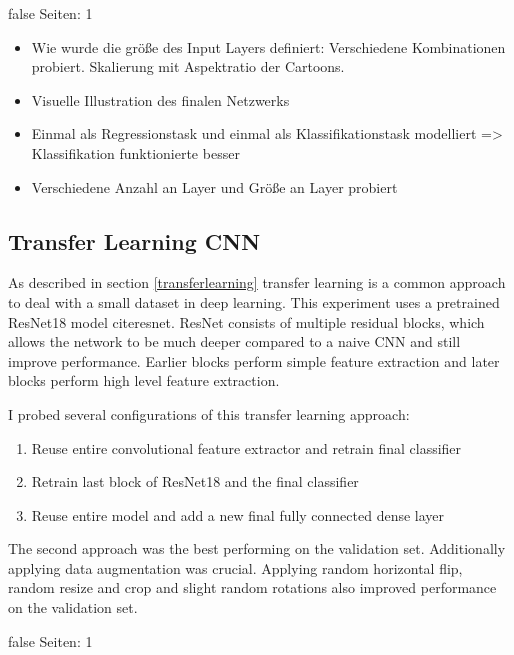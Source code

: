 \documentclass[draft,final,oneside]{vutinfth} %
\begin{document}

\if false
Seiten: 1

\begin{itemize}
\item Wie wurde die größe des Input Layers definiert: Verschiedene Kombinationen probiert. Skalierung mit Aspektratio der Cartoons. 
\item Visuelle Illustration des finalen Netzwerks
\item Einmal als Regressionstask und einmal als Klassifikationstask modelliert => Klassifikation funktionierte besser
\item Verschiedene Anzahl an Layer und Größe an Layer probiert
\end{itemize}

\fi

\subsection{Transfer Learning CNN}

As described in section \ref{transferlearning} transfer learning is a common approach to deal with a small dataset in deep learning. This experiment uses a pretrained ResNet18 model cite{resnet}. ResNet consists of multiple residual blocks, which allows the network to be much deeper compared to a naive CNN and still improve performance. Earlier blocks perform simple feature extraction and later blocks perform high level feature extraction. 

I probed several configurations of this transfer learning approach:

\begin{enumerate}
\item Reuse entire convolutional feature extractor and retrain final classifier
\item Retrain last block of ResNet18 and the final classifier
\item Reuse entire model and add a new final fully connected dense layer
\end{enumerate}

The second approach was the best performing on the validation set. Additionally applying data augmentation was crucial. Applying random horizontal flip, random resize and crop and slight random rotations also improved performance on the validation set.


\if false
Seiten: 1
\end{document}
